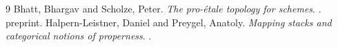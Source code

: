 \begin{thebibliography}{9}
Bhatt, Bhargav and Scholze, Peter.
\newblock \emph{The pro-\'etale topology for schemes}.
. preprint.
Halpern-Leistner, Daniel and Preygel, Anatoly.
\newblock \emph{Mapping stacks and categorical notions of properness}.
.
\end{thebibliography}
